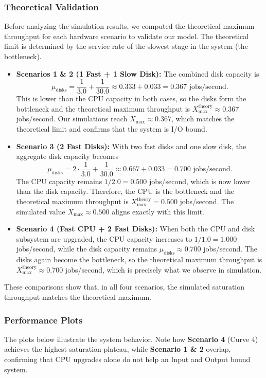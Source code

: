 \documentclass[a4paper,10pt]{article}
\begin{document}
\subsubsection{Theoretical Validation}
Before analyzing the simulation results, we computed the theoretical maximum throughput for each hardware scenario to validate our model. The theoretical limit is determined by the service rate of the slowest stage in the system (the bottleneck).

\begin{itemize}
    \item \textbf{Scenarios 1 \& 2 (1 Fast + 1 Slow Disk):}
    The combined disk capacity is
    \[
        \mu_{\text{disks}} = \frac{1}{3.0} + \frac{1}{30.0} \approx 0.333 + 0.033 = 0.367 \text{ jobs/second}.
    \]
    This is lower than the CPU capacity in both cases, so the disks form the bottleneck and the theoretical maximum throughput is $X_{\max}^{\text{theory}} \approx 0.367$ jobs/second. Our simulations reach $X_{\max} \approx 0.367$, which matches the theoretical limit and confirms that the system is I/O bound.

    \item \textbf{Scenario 3 (2 Fast Disks):}
    With two fast disks and one slow disk, the aggregate disk capacity becomes
    \[
        \mu_{\text{disks}} = 2 \cdot \frac{1}{3.0} + \frac{1}{30.0} \approx 0.667 + 0.033 = 0.700 \text{ jobs/second}.
    \]
    The CPU capacity remains $1/2.0 = 0.500$ jobs/second, which is now lower than the disk capacity. Therefore, the CPU is the bottleneck and the theoretical maximum throughput is $X_{\max}^{\text{theory}} = 0.500$ jobs/second. The simulated value $X_{\max} \approx 0.500$ aligns exactly with this limit.

    \item \textbf{Scenario 4 (Fast CPU + 2 Fast Disks):}
    When both the CPU and disk subsystem are upgraded, the CPU capacity increases to $1/1.0 = 1.000$ jobs/second, while the disk capacity remains $\mu_{\text{disks}} \approx 0.700$ jobs/second. The disks again become the bottleneck, so the theoretical maximum throughput is $X_{\max}^{\text{theory}} \approx 0.700$ jobs/second, which is precisely what we observe in simulation.
\end{itemize}

These comparisons show that, in all four scenarios, the simulated saturation throughput matches the theoretical maximum. 


\subsubsection{Performance Plots}
The plots below illustrate the system behavior. Note how \textbf{Scenario 4} (Curve 4) achieves the highest saturation plateau, while \textbf{Scenario 1 \& 2} overlap, confirming that CPU upgrades alone do not help an Input and Output bound system.
\end{document}
